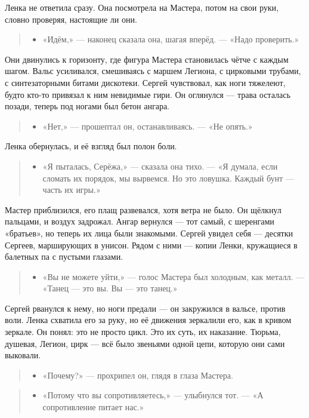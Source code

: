 \documentclass[12pt,a4paper]{book}
\newenvironment{dialogue}{\begin{quote}\itshape\begin{itemize}\item[]}{\end{itemize}\end{quote}}
\begin{document}
Ленка не ответила сразу. Она посмотрела на Мастера, потом на свои руки, словно проверяя, настоящие ли они.

\begin{dialogue}
«Идём,» --- наконец сказала она, шагая вперёд. --- «Надо проверить.»
\end{dialogue}

Они двинулись к горизонту, где фигура Мастера становилась чётче с каждым шагом. Вальс усиливался, смешиваясь с маршем Легиона, с цирковыми трубами, с синтезаторными битами дискотеки. Сергей чувствовал, как ноги тяжелеют, будто кто-то привязал к ним невидимые гири. Он оглянулся --- трава осталась позади, теперь под ногами был бетон ангара.

\begin{dialogue}
«Нет,» --- прошептал он, останавливаясь. --- «Не опять.»
\end{dialogue}

Ленка обернулась, и её взгляд был полон боли.

\begin{dialogue}
«Я пыталась, Серёжа,» --- сказала она тихо. --- «Я думала, если сломать их порядок, мы вырвемся. Но это ловушка. Каждый бунт — часть их игры.»
\end{dialogue}

Мастер приблизился, его плащ развевался, хотя ветра не было. Он щёлкнул пальцами, и воздух задрожал. Ангар вернулся --- тот самый, с шеренгами «братьев», но теперь их лица были знакомыми. Сергей увидел себя --- десятки Сергеев, марширующих в унисон. Рядом с ними --- копии Ленки, кружащиеся в балетных па с пустыми глазами.

\begin{dialogue}
«Вы не можете уйти,» --- голос Мастера был холодным, как металл. --- «Танец — это вы. Вы — это танец.»
\end{dialogue}

Сергей рванулся к нему, но ноги предали --- он закружился в вальсе, против воли. Ленка схватила его за руку, но её движения зеркалили его, как в кривом зеркале. Он понял: это не просто цикл. Это их суть, их наказание. Тюрьма, душевая, Легион, цирк --- всё было звеньями одной цепи, которую они сами выковали.

\begin{dialogue}
«Почему?» --- прохрипел он, глядя в глаза Мастера.
\end{dialogue}

\begin{dialogue}
«Потому что вы сопротивляетесь,» --- улыбнулся тот. --- «А сопротивление питает нас.»
\end{dialogue}
\end{document}
